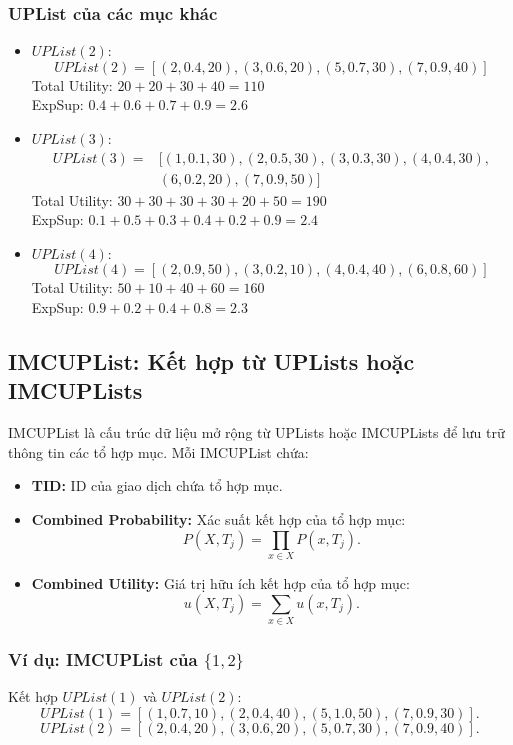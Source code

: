 \documentclass[conference]{IEEEtran}
\begin{document}
\subsubsection{UPList của các mục khác}
\begin{itemize}
    \item \(UPList(2)\):
    \[
    UPList(2) = [(2, 0.4, 20), (3, 0.6, 20), (5, 0.7, 30), (7, 0.9, 40)]
    \]
    Total Utility: \(20 + 20 + 30 + 40 = 110\)\\  
    ExpSup: \(0.4 + 0.6 + 0.7 + 0.9 = 2.6\)

    \item \(UPList(3)\):
    \begin{align*}
    UPList(3) = &[(1, 0.1, 30), (2, 0.5, 30), (3, 0.3, 30), (4, 0.4, 30), \\
                &(6, 0.2, 20), (7, 0.9, 50)]
    \end{align*}
    Total Utility: \(30 + 30 + 30 + 30 + 20 + 50 = 190\)\\  
    ExpSup: \(0.1 + 0.5 + 0.3 + 0.4 + 0.2 + 0.9 = 2.4\)

    \item \(UPList(4)\):
    \[
    UPList(4) = [(2, 0.9, 50), (3, 0.2, 10), (4, 0.4, 40), (6, 0.8, 60)]
    \]
    Total Utility: \(50 + 10 + 40 + 60 = 160\) \\
    ExpSup: \(0.9 + 0.2 + 0.4 + 0.8 = 2.3\)
\end{itemize}

\subsection{IMCUPList: Kết hợp từ UPLists hoặc IMCUPLists}
IMCUPList là cấu trúc dữ liệu mở rộng từ UPLists hoặc IMCUPLists để lưu trữ thông tin các tổ hợp mục. Mỗi IMCUPList chứa:
\begin{itemize}
    \item \textbf{TID:} ID của giao dịch chứa tổ hợp mục.
    \item \textbf{Combined Probability:} Xác suất kết hợp của tổ hợp mục:
    \[
    P(X, T_j) = \prod_{x \in X} P(x, T_j).
    \]
    \item \textbf{Combined Utility:} Giá trị hữu ích kết hợp của tổ hợp mục:
    \[
    u(X, T_j) = \sum_{x \in X} u(x, T_j).
    \]
\end{itemize}

\subsubsection{Ví dụ: IMCUPList của \(\{1, 2\}\)}
Kết hợp \(UPList(1)\) và \(UPList(2)\):
\[
UPList(1) = [(1, 0.7, 10), (2, 0.4, 40), (5, 1.0, 50), (7, 0.9, 30)].
\]
\[
UPList(2) = [(2, 0.4, 20), (3, 0.6, 20), (5, 0.7, 30), (7, 0.9, 40)].
\]
\end{document}
